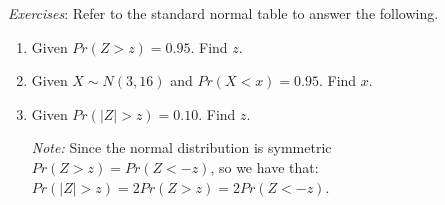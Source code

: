 \documentclass{./../../Latex/handout}
\begin{document}
\textit{Exercises}: Refer to the standard normal table to answer the following.
\begin{enumerate}
  \item Given $Pr(Z>z) = 0.95 $. Find $z$. \vspace{3cm}
  \item Given  $X \sim N(3, 16)$ and $Pr(X<x) = 0.95 $. Find $x$. \vspace{4cm}
  \item Given $Pr(|Z|>z) = 0.10 $. Find $z$. \\ \vspace{-0.25cm}
 
  \textit{Note:} Since the normal distribution is symmetric $Pr(Z>z)=Pr(Z<-z)$, so we have that: $Pr(|Z|>z) = 2 Pr(Z>z) = 2 Pr(Z<-z) $. \\ 
 \vspace{3cm}
\end{enumerate}
\end{document}
